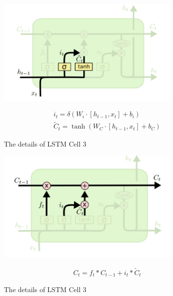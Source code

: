 \documentclass[12pt,a4paper]{article}
\begin{document}
\begin{figure}
\begin{minipage}[c]{0.5\textwidth}
\centering   
\includegraphics[width=0.8\textwidth]{pic/7.PNG}
\end{minipage}
%
\begin{minipage}[c]{0.5\textwidth}
\begin{equation*}
	\begin{array}{l}
	i_t = \delta (W_i \cdot [h_{t-1}, x_t] + b_i)\\
	\tilde{C}_t = \tanh(W_C \cdot [h_{t-1}, x_t] + b_{C})
	\end{array}
\end{equation*}
\end{minipage}
\caption{The details of LSTM Cell 3}
 \label{fig:7} 
\end{figure}

\begin{figure}
\begin{minipage}[c]{0.5\textwidth}
\centering   
\includegraphics[width=0.8\textwidth]{pic/8.PNG}
\end{minipage}
%
\begin{minipage}[c]{0.5\textwidth}
\begin{equation*}
	\begin{array}{l}
	C_t = f_t * C_{t-1} + i_t * \tilde{C}_t
	\end{array}
\end{equation*}
\end{minipage}
\caption{The details of LSTM Cell 3}
 \label{fig:8} 
\end{figure}
\end{document}
